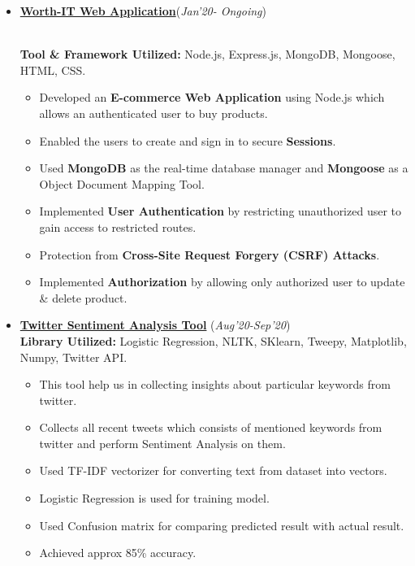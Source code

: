 \documentclass[10pt]{extarticle}
\begin{document}
\begin{itemize}
\item \href{https://github.com/ShubhamKumar1996/Worth_IT-Web_Application}{\textbf{Worth-IT Web Application}}\hfill\hfill(\textit{Jan'20- Ongoing})

\\\textbf{Tool \& Framework Utilized: }Node.js, Express.js, MongoDB, Mongoose, HTML, CSS.
\begin{itemize}
\item Developed an \textbf{E-commerce Web Application} using Node.js which allows an authenticated user to buy products. 
\item Enabled the users to create and sign in to secure \textbf{Sessions}. 
\item Used \textbf{MongoDB} as the real-time database manager and \textbf{Mongoose} as a Object Document Mapping Tool.
\item Implemented \textbf{User Authentication} by restricting unauthorized user to gain access to restricted routes.
\item Protection from \textbf{Cross-Site Request Forgery (CSRF) Attacks}.
\item Implemented \textbf{Authorization} by allowing only authorized user to update \& delete product.
\end{itemize}
\vspace{1mm}
\item \href{https://github.com/ShubhamKumar1996/Twitter_Sentiment_Analysis_Tool}{\textbf{Twitter Sentiment Analysis Tool}} \hfill\hfill(\textit{Aug'20-Sep'20})
\\\textbf{Library Utilized: }Logistic Regression, NLTK, SKlearn, Tweepy, Matplotlib, Numpy, Twitter API.
\begin{itemize}
\item This tool help us in collecting insights about particular keywords from twitter.
\item Collects all recent tweets which consists of mentioned keywords from twitter and perform Sentiment Analysis on them.
\item Used TF-IDF vectorizer for converting text from dataset into vectors.
\item Logistic Regression is used for training model.
\item Used Confusion matrix for comparing predicted result with actual result.
\item Achieved approx 85\% accuracy.
\end{itemize}
\vspace{2mm}

\end{itemize}
\end{document}
